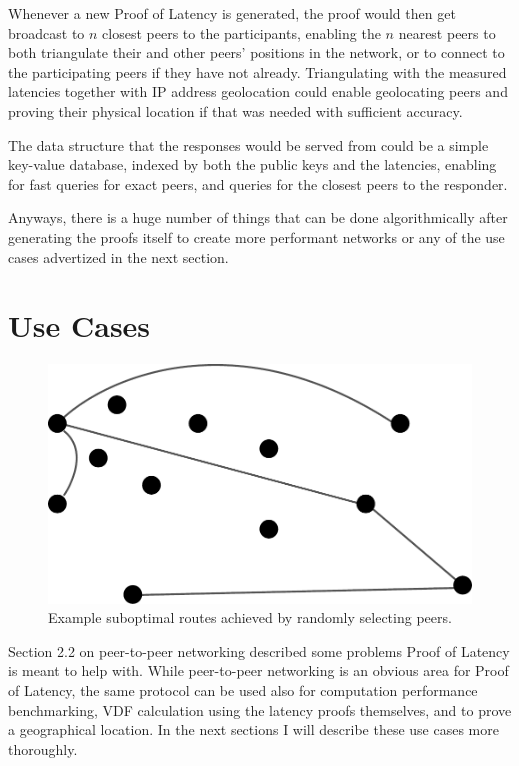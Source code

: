 Whenever a new Proof of Latency is generated, the proof would then get broadcast to \(n\) closest peers to the participants, enabling the \(n\) nearest peers to both triangulate their and other peers' positions in the network, or to connect to the participating peers if they have not already. Triangulating with the measured latencies together with IP address geolocation could enable geolocating peers and proving their physical location if that was needed with sufficient accuracy.~\cite{Katz-Bassett2006-zq}

The data structure that the responses would be served from could be a simple key-value database, indexed by both the public keys and the latencies, enabling for fast queries for exact peers, and queries for the closest peers to the responder.

Anyways, there is a huge number of things that can be done algorithmically after generating the proofs itself to create more performant networks or any of the use cases advertized in the next section.

\section{Use Cases}
\begin{figure}
	\includegraphics[width=\textwidth]{pictures/random_routing.pdf}
	\caption{Example suboptimal routes achieved by randomly selecting peers.}
	\label{Subobtimal Topology}
\end{figure}
Section 2.2 on peer-to-peer networking described some problems Proof of Latency is meant to help with. While peer-to-peer networking is an obvious area for Proof of Latency, the same protocol can be used also for computation performance benchmarking, VDF calculation using the latency proofs themselves, and to prove a geographical location. In the next sections I will describe these use cases more thoroughly.

